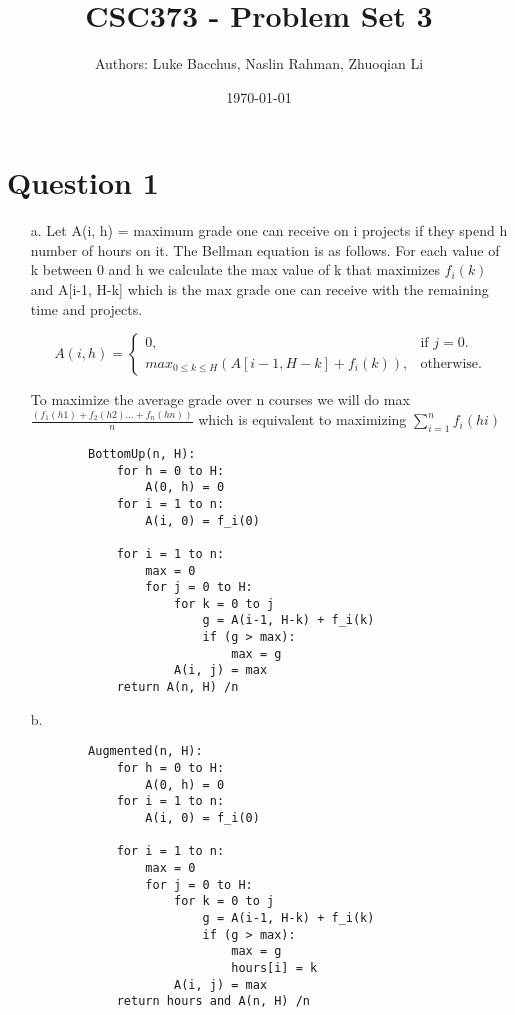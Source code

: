 \documentclass[12pt]{article}
\title{\textbf{CSC373 - Problem Set 3}}
\author{Authors: Luke Bacchus, Naslin Rahman, Zhuoqian Li}
\date{\today}
\begin{document}
\maketitle
\section*{Question 1}
\begin{enumerate}
    \item[a.] Let A(i, h) = maximum grade one can receive on i projects if they spend h number of 
    hours on it. The Bellman equation is as follows. For each value of k between 0 and h we calculate 
    the max value of k that maximizes $f_i(k)$ and A[i-1, H-k] which is the max grade one can receive 
    with the remaining time and projects.
    
        \begin{equation}
            A(i,h)=\begin{cases}
         0, & \text{if $j=0$}.\\
        max_{0 \leq k \leq H}(A[i-1,H-k] + f_i(k)), & \text{otherwise}.
        \end{cases}
        \end{equation}
  
    To maximize the average grade over n courses we will do max $\frac{(f_1(h1) + f_2(h2) ... + f_n(hn))}{n}$ which is equivalent to maximizing $\sum_{i = 1}^ {n} f_i(hi)$
  
    \begin{verbatim}
        BottomUp(n, H):
            for h = 0 to H:
                A(0, h) = 0
            for i = 1 to n:
                A(i, 0) = f_i(0)
            
            for i = 1 to n:
                max = 0
                for j = 0 to H:
                    for k = 0 to j
                        g = A(i-1, H-k) + f_i(k)
                        if (g > max):
                            max = g
                    A(i, j) = max
            return A(n, H) /n
    \end{verbatim}
    
    \item[b.] \begin{verbatim}
        Augmented(n, H):
            for h = 0 to H:
                A(0, h) = 0
            for i = 1 to n:
                A(i, 0) = f_i(0)
            
            for i = 1 to n:
                max = 0
                for j = 0 to H:
                    for k = 0 to j
                        g = A(i-1, H-k) + f_i(k)
                        if (g > max):
                            max = g
                            hours[i] = k
                    A(i, j) = max
            return hours and A(n, H) /n
                    
        
    \end{verbatim}
\end{enumerate}
    
\end{document}
